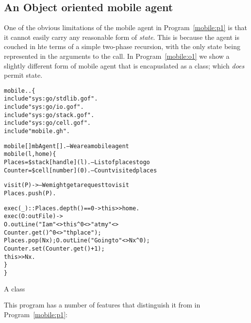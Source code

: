 \subsection{An Object oriented mobile agent}
\label{mobile:object}
One of the obvious limitations of the mobile agent in Program~\vref{mobile:p1} is that it cannot easily carry any reasonable form of \emph{state}. This is because the agent is couched in hte terms of a simple two-phase recursion, with the only state being represented in the arguments to the  call. In Program~\vref{mobile:o1} we show a slightly different form of mobile agent that is encapuslated as a class; which \emph{does} permit state.
\begin{program}
\begin{alltt}
mobile..\{
  include "sys:go/stdlib.gof".
  include "sys:go/io.gof".
  include "sys:go/stack.gof".
  include "sys:go/cell.gof".
  include "mobile.gh".

  mobile[]\impl{}mbAgent[].        -- We are a mobile agent 
  mobile(l,home)\{
    Places = \$stack[handle](l).   -- List of places to go
    Counter = \$cell[number](0).   -- Count visited places

    visit(P) ->         -- We might get a request to visit
        Places.push(P).

    exec(\_)::Places.depth()==0 -> this>>home.
    exec(O:outFile) ->
        O.outLine("I am "{}<>this^0<>" at my "{}<>
                  Counter.get()^0<>"th place");
        Places.pop(Nx); O.outLine("Going to "{}<>Nx^0);
        Counter.set(Counter.get()+1);
        this >> Nx.
  \}
\}
\end{alltt}
\caption{A  class}
\label{mobile:o1}
\end{program}
This program has a number of features that distinguish it from  in Program~\vref{mobile:p1}:
